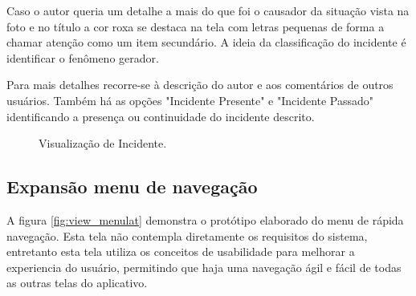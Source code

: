 \documentclass[12pt]{article}
\begin{document}
Caso o autor queria um detalhe a mais do que foi o causador da situação vista na foto e no título a cor roxa se destaca na tela com letras pequenas de forma a chamar atenção como um item secundário. A ideia da classificação do incidente é identificar o fenômeno gerador.

Para mais detalhes recorre-se à descrição do autor e aos comentários de outros usuários. Também há as opções "Incidente Presente"  e "Incidente Passado" identificando a presença ou continuidade do incidente descrito.


\begin{figure}[h!]
  \caption{Visualização de Incidente.}
  \label{fig:view_incident}
\end{figure}
\vfill%
\pagebreak%

\subsection{Expansão menu de navegação}\label{subsec:SecMenu}

A figura \ref{fig:view_menulat} demonstra o protótipo elaborado do menu de rápida navegação. Esta tela não contempla diretamente os requisitos do sistema, entretanto esta tela utiliza os conceitos de usabilidade para melhorar a experiencia do usuário, permitindo que haja uma navegação ágil e fácil de todas as outras telas do aplicativo.
\end{document}

